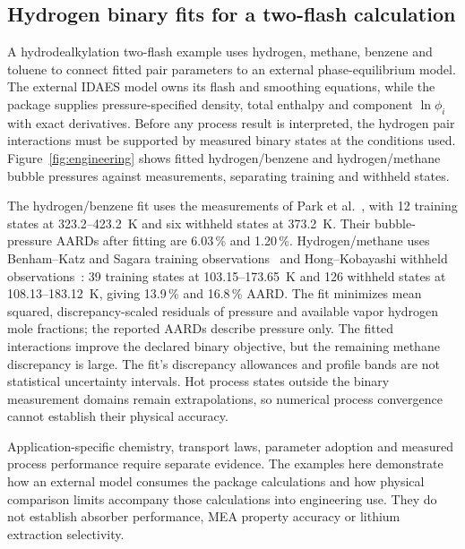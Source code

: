 \subsection{Hydrogen binary fits for a two-flash calculation}
A hydrodealkylation two-flash example uses hydrogen, methane, benzene and toluene to connect fitted pair parameters to an external phase-equilibrium model.
The external IDAES model owns its flash and smoothing equations, while the package supplies pressure-specified density, total enthalpy and component $\ln\phi_i$ with exact derivatives.
Before any process result is interpreted, the hydrogen pair interactions must be supported by measured binary states at the conditions used.
Figure~\ref{fig:engineering} shows fitted hydrogen/benzene and hydrogen/methane bubble pressures against measurements, separating training and withheld states.

The hydrogen/benzene fit uses the measurements of Park et al.~\citep{Park1996}, with 12 training states at 323.2--423.2~K and six withheld states at 373.2~K.
Their bubble-pressure AARDs after fitting are 6.03\,\% and 1.20\,\%.
Hydrogen/methane uses Benham--Katz and Sagara training observations~\citep{Benham1957,Sagara1972} and Hong--Kobayashi withheld observations~\citep{Hong1981}: 39 training states at 103.15--173.65~K and 126 withheld states at 108.13--183.12~K, giving 13.9\,\% and 16.8\,\% AARD.
The fit minimizes mean squared, discrepancy-scaled residuals of pressure and available vapor hydrogen mole fractions; the reported AARDs describe pressure only.
The fitted interactions improve the declared binary objective, but the remaining methane discrepancy is large.
The fit's discrepancy allowances and profile bands are not statistical uncertainty intervals.
Hot process states outside the binary measurement domains remain extrapolations, so numerical process convergence cannot establish their physical accuracy.



Application-specific chemistry, transport laws, parameter adoption and measured process performance require separate evidence.
The examples here demonstrate how an external model consumes the package calculations and how physical comparison limits accompany those calculations into engineering use.
They do not establish absorber performance, MEA property accuracy or lithium extraction selectivity.
